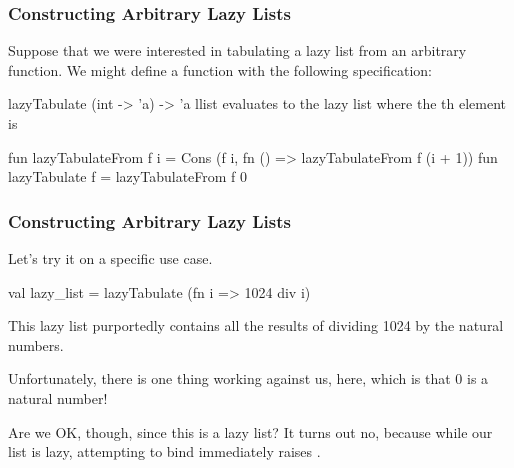 \documentclass[aspectratio=169]{beamer}
\begin{document}
\begin{frame}[fragile]
  \frametitle{Constructing Arbitrary Lazy Lists}

  Suppose that we were interested in tabulating a lazy list from an
  arbitrary function. We might define a function  with the
  following specification:

  \pause
  \spec
    {lazyTabulate}
    {(int -> 'a) -> 'a llist}
    {}
    { evaluates to the lazy list where the th
    element is }

  \pause
  \vspace{\fill}

  \begin{codeblock}
    fun lazyTabulateFrom f i =
      Cons (f i, fn () => lazyTabulateFrom f (i + 1))
    fun lazyTabulate f = lazyTabulateFrom f 0
  \end{codeblock}
\end{frame}

\begin{frame}[fragile]
  \frametitle{Constructing Arbitrary Lazy Lists}

  Let's try it on a specific use case.

  \pause
  \vspace{\fill}

  \begin{codeblock}
    val lazy_list = lazyTabulate (fn i => 1024 div i)
  \end{codeblock}

  \pause
  \vspace{\fill}

  This lazy list purportedly contains all the results of dividing
  1024 by the natural numbers.

  \vspace{\fill}

  Unfortunately, there is one thing working against us, here, which is
  that 0 is a natural number!

  \pause
  \vspace{\fill}

  Are we OK, though, since this is a lazy list? It turns out no, because
  while our list is lazy, attempting to bind  immediately
  raises .
\end{frame}
\end{document}
